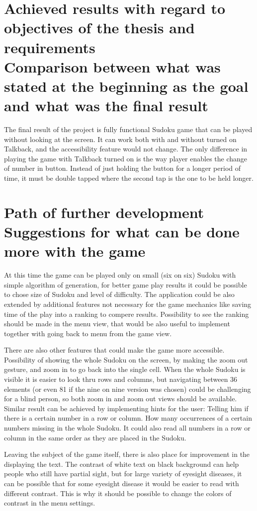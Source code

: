 \documentclass[a4paper,twoside,12pt]{book}
\begin{document}
\clearpage

\section{Achieved results with regard to objectives of the thesis and requirements \\{\large Comparison between what was stated at the beginning as the goal and what was the final result}}

\par The final result of the project is fully functional Sudoku game that can be played without looking at the screen. It can work both with and without turned on Talkback, and the accessibility feature would not change. The only difference in playing the game with Talkback turned on is the way player enables the change of number in button. Instead of just holding the button for a longer period of time, it must be double tapped where the second tap is the one to be held longer.

\section{Path of further development \\{\large Suggestions for what can be done more with the game}}

\par At this time the game can be played only on small (six on six) Sudoku with simple algorithm of generation, for better game play results it could be possible to chose size of Sudoku and level of difficulty. The application could be also extended by additional features not necessary for the game mechanics like saving time of the play into a ranking to compere results. Possibility to see the ranking should be made in the menu view, that would be also useful to implement together with going back to menu from the game view.
\par There are also other features that could make the game more accessible. Possibility of showing the whole Sudoku on the screen, by making the zoom out gesture, and zoom in to go back into the single cell. When the whole Sudoku is visible it is easier to look thru rows and columns, but navigating between 36 elements (or even 81 if the nine on nine version was chosen) could be challenging for a blind person, so both zoom in and zoom out views should be available. Similar result can be achieved by implementing hints for the user: Telling him if there is a certain number in a row or column. How many occurrences of a certain numbers missing in the whole Sudoku. It could also read all numbers in a row or column in the same order as they are placed in the Sudoku.
\par Leaving the subject of the game itself, there is also place for improvement in the displaying the text. The contrast of white text on black background can help people who still have partial sight, but for large variety of eyesight diseases, it can be possible that for some eyesight disease it would be easier to read with different contrast. This is why it should be possible to change the colors of contrast in the menu settings.
\end{document}
